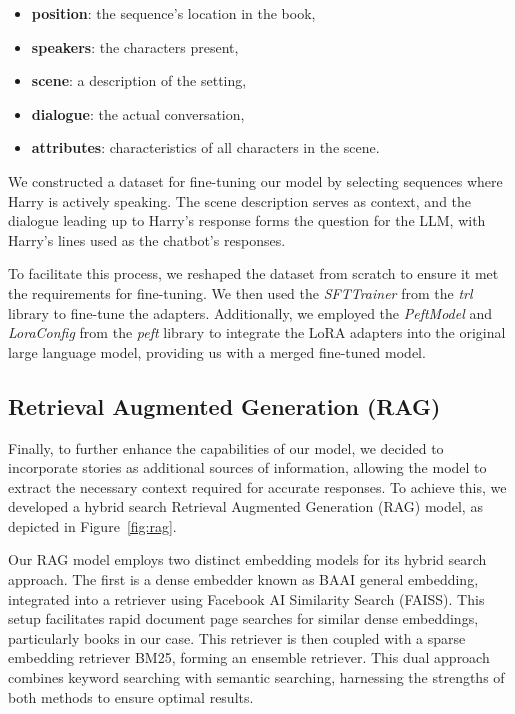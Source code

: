 \documentclass[fleqn,moreauthors,10pt]{ds_report}
\begin{document}
    \begin{itemize}
        \item \textbf{position}: the sequence's location in the book,
        \item \textbf{speakers}: the characters present,
        \item \textbf{scene}: a description of the setting,
        \item \textbf{dialogue}: the actual conversation,
        \item \textbf{attributes}: characteristics of all characters in the scene.
    \end{itemize}

    We constructed a dataset for fine-tuning our model by selecting sequences where Harry is actively speaking. The scene description serves as context, and the dialogue leading up to Harry's response forms the question for the LLM, with Harry's lines used as the chatbot's responses.

    To facilitate this process, we reshaped the dataset from scratch to ensure it met the requirements for fine-tuning. We then used the \textit{SFTTrainer} from the \textit{trl} library to fine-tune the adapters. Additionally, we employed the \textit{PeftModel} and \textit{LoraConfig} from the \textit{peft} library to integrate the LoRA adapters into the original large language model, providing us with a merged fine-tuned model.
    
    \subsection*{Retrieval Augmented Generation (RAG)}

    Finally, to further enhance the capabilities of our model, we decided to incorporate stories as additional sources of information, allowing the model to extract the necessary context required for accurate responses. To achieve this, we developed a hybrid search Retrieval Augmented Generation (RAG) model, as depicted in Figure~\ref{fig:rag}.
    
    Our RAG model employs two distinct embedding models for its hybrid search approach. The first is a dense embedder known as BAAI general embedding, integrated into a retriever using Facebook AI Similarity Search (FAISS). This setup facilitates rapid document page searches for similar dense embeddings, particularly books in our case. This retriever is then coupled with a sparse embedding retriever BM25, forming an ensemble retriever. This dual approach combines keyword searching with semantic searching, harnessing the strengths of both methods to ensure optimal results.
    
\end{document}
